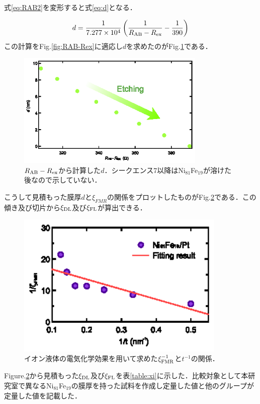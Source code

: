 式\ref{eq:RAB2}を変形すると式\ref{eq:d}となる．

\begin{eqnarray}
d = \frac{1}{7.277\times10^{4}}\left(\frac{1}{R_{\rm AB} - R_{\rm ex}}-\frac{1}{390}\right)
\label{eq:d}
\end{eqnarray}
この計算をFig.\ref{fig:RAB-Rex}に適応し$d$を求めたのがFig.\ref{fig:d_after}である．

\begin{figure}[htbp]
\centerline{
\includegraphics[width=9cm]{images/d_after.eps}
}
\caption{$R_{\rm AB}-R_{\rm ex}$から計算した$d$．シークエンス7以降はNi$_{81}$Fe$_{19}$が溶けた後なので示していない．
}
\label{fig:d_after}
\end{figure}

こうして見積もった膜厚$d$と$\xi_{FMR}$の関係をプロットしたものがFig.\ref{fig:xi-1_after}である．この傾き及び切片から$\xi_{\rm DL}$及び$\xi_{\rm FL}$が算出できる．

\begin{figure}[htbp]
\centerline{
\includegraphics[width=10cm]{images/xi-1_after.eps}
}
\caption{イオン液体の電気化学効果を用いて求めた$\xi_{\rm FMR}^{-1}$と$t^{-1}$の関係．
}
\label{fig:xi-1_after}
\end{figure}

Figure.\ref{fig:xi-1_after}から見積もった$\xi_{\rm DL}$及び$\xi_{\rm FL}$を表\ref{table:xi}に示した．比較対象として本研究室で異なるNi$_{81}$Fe$_{19}$の膜厚を持った試料を作成し定量した値と他のグループが定量した値を記載した．


